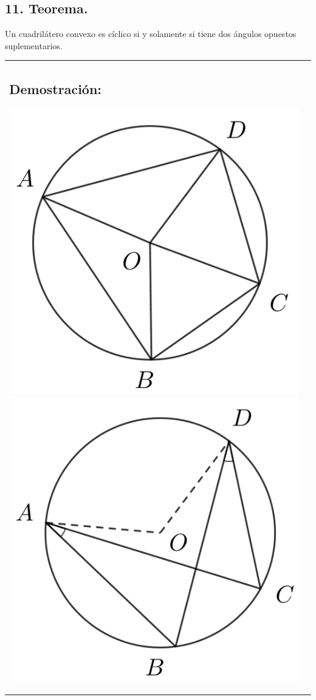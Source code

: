 \documentclass[12pt,a4paper]{article}
\begin{document}
\subsection*{11. Teorema.}
Un cuadrilátero convexo es cíclico si y solamente si tiene dos ángulos opuestos suplementarios.\\
\begin{tabular}{p{15.9 cm} p{1cm}}
\subsection*{Demostración:}
\begin{center}
\includegraphics[scale=0.6]{ciclico.png} 
\includegraphics[scale=0.6]{ciclico1.png} 

\end{center}
\end{tabular}
\end{document}
